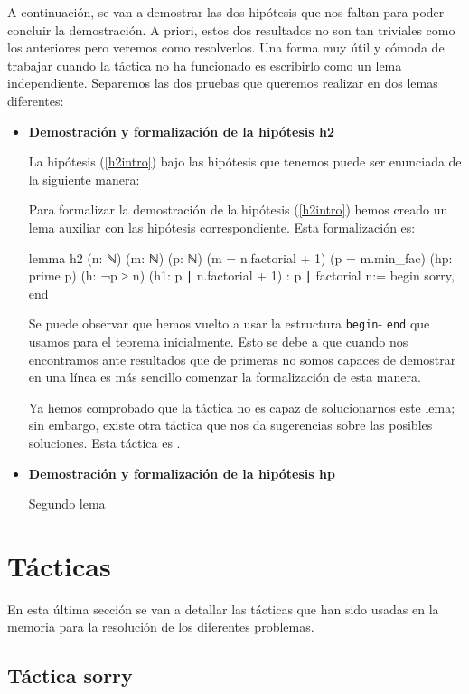A continuación, se van a demostrar las dos hipótesis que nos faltan para poder
concluir la demostración. A priori, estos dos resultados no son tan triviales
como los anteriores pero veremos como resolverlos. Una forma muy útil y cómoda
de trabajar cuando la táctica  no
ha funcionado es escribirlo como un lema independiente. Separemos las dos
pruebas que queremos realizar en dos lemas diferentes:
\begin{itemize}
\item \textbf{Demostración y formalización de la hipótesis h2}

  La hipótesis (\ref{h2intro}) bajo las hipótesis que tenemos puede ser
  enunciada de la siguiente manera:
  \begin{lema}

  \end{lema}

  Para formalizar la demostración de la hipótesis (\ref{h2intro}) hemos creado
  un lema auxiliar con las hipótesis correspondiente. Esta formalización es:
  \begin{leancode}
  lemma h2 
  (n: ℕ)
  (m: ℕ)
  (p: ℕ)
  (m = n.factorial + 1)
  (p = m.min_fac)
  (hp: prime p)
  (h: ¬p ≥ n)
  (h1: p ∣ n.factorial + 1)
  : p ∣ factorial n:=
  begin
    sorry,
  end
  \end{leancode}

  Se puede observar que hemos vuelto a usar la estructura \texttt{begin}-
  \texttt{end} que usamos para el teorema inicialmente. Esto se debe a que
  cuando nos encontramos ante resultados que de primeras no somos capaces de
  demostrar en una línea es más sencillo comenzar la formalización de esta
  manera.

  Ya hemos comprobado que la táctica 
  no es capaz de solucionarnos este lema; sin embargo, existe otra táctica que
  nos da sugerencias sobre las posibles soluciones. Esta táctica es
  .

\item \textbf{Demostración y formalización de la hipótesis hp}
  
  Segundo lema
\end{itemize}







\section{Tácticas}
En esta última sección se van a detallar las tácticas que han sido usadas en
la memoria para la resolución de los diferentes problemas.

\subsection{Táctica sorry}

